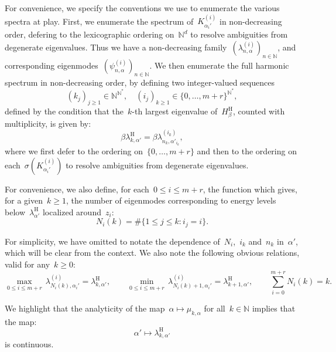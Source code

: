 \documentclass[10pt]{article}
\newcommand{\N}{\mathbb N}
\newcommand{\1}{\mathbbm 1}
\newcommand{\Ki}[1]{K^{(i)}_{#1}}
\newcommand{\psii}[2]{\psi^{(i)}_{#1,#2}}
\newcommand{\lambdai}[2]{\lambda^{(i)}_{#1,#2}}
\begin{document}
    For convenience, we specify the conventions we use to enumerate the various spectra at play.
    First, we enumerate the spectrum of~$\Ki{\alpha_i'}$ in non-decreasing order, defering to the lexicographic ordering on~$\N^d$ to resolve ambiguities from degenerate eigenvalues. Thus we have a non-decreasing family~$(\lambdai{n}{\alpha})_{n\in\N}$, and corresponding eigenmodes~$(\psii{n}{\alpha})_{n\in\N}$.
    We then enumerate the full harmonic spectrum in non-decreasing order, by defining two integer-valued sequences
    \begin{equation}
        \label{eq:eigenstate_enumeration}
        (k_j)_{j\geq 1}\in \N^{\N^*},\quad (i_j)_{k\geq 1}\in \{0,\dots,m+r\}^{\N^*},
    \end{equation}
    defined by the condition that the~$k$-th largest eigenvalue of~$H_\beta^{\mathrm H}$, counted with multiplicity, is given by:
    \begin{equation}
        \beta\lambda_{k,\alpha'}^{\mathrm H} = \beta\lambda^{(i_k)}_{n_k,\alpha'_{i_k}},
    \end{equation}
    where we first defer to the ordering on~$\{0,\dots,m+r\}$ and then to the ordering on each~$\sigma(\Ki{\alpha_i'})$ to resolve ambiguities from degenerate eigenvalues.

    For convenience, we also define, for each~$0\leq i \leq m+r$, the function which gives, for a given~$k\geq 1$, the number of eigenmodes corresponding to energy levels below~$\lambda_{\alpha'}^{\mathrm H}$ localized around~$z_i$:
    \begin{equation}
        \label{eq:def_ni}
        N_{i}(k) = \#\{ 1 \leq j \leq k: i_j = i\}.
    \end{equation}

    For simplicity, we have omitted to notate the dependence of~$N_i$,~$i_k$ and~$n_k$ in~$\alpha'$, which will be clear from the context.
    We also note the following obvious relations, valid for any~$k\geq 0$:
    \begin{equation}
        \label{eq:enumeration_relations}
        \underset{0\leq i\leq m+r}{\max}\,\lambda^{(i)}_{N_i(k),\alpha_i'}  = \lambda_{k,\alpha'}^{\mathrm H},\qquad \underset{0\leq i\leq m+r}{\min}\,\lambda^{(i)}_{N_i(k)+1,\alpha_i'} = \lambda_{k+1,\alpha'}^{\mathrm H},\qquad \sum_{i=0}^{m+r} N_i(k) = k.
    \end{equation}

    We highlight that the analyticity of the map~$\alpha \mapsto \mu_{k,\alpha}$ for all~$k\in \N$ implies that the map:
    \begin{equation}
        \label{eq:eigval_continuity}
        \alpha' \mapsto \lambda_{k,\alpha'}^{\mathrm H}
    \end{equation}
    is continuous.
\end{document}
